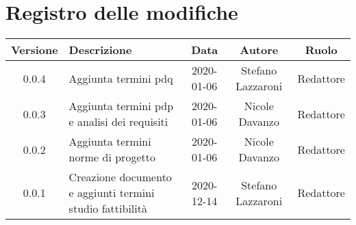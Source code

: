 \section*{Registro delle modifiche}

\begin{center}
	\begin{longtable}{|c|p{5cm}|c|c|c|}
	\hline
	\rowcolor{lighter-grayer}
	\textbf{Versione} & \textbf{Descrizione} & \textbf{Data} & \textbf{Autore} & \textbf{Ruolo} \\
	\hline
	\endfirsthead


	\hline
	0.0.4 & Aggiunta termini pdq& 2020-01-06 & Stefano Lazzaroni & Redattore \\
	0.0.3 & Aggiunta termini pdp e analisi dei requisiti& 2020-01-06 & Nicole Davanzo & Redattore \\
	0.0.2 & Aggiunta termini norme di progetto& 2020-01-06 & Nicole Davanzo & Redattore \\
	0.0.1 & Creazione documento e aggiunti termini studio fattibilità & 2020-12-14 & Stefano Lazzaroni & Redattore \\
	\hline

	\end{longtable}
\end{center}